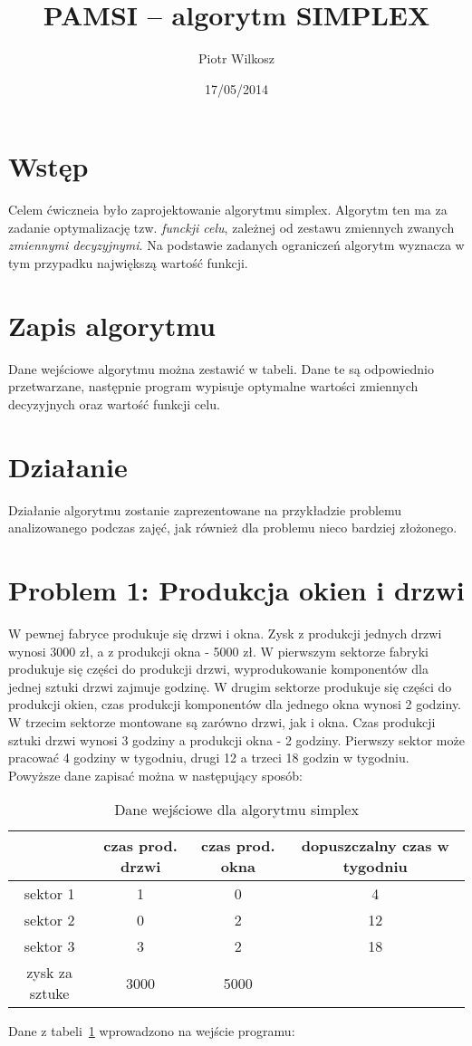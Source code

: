 \documentclass[a4paper,11pt]{article}
\date{17/05/2014}
\title{PAMSI -- algorytm SIMPLEX}
\author{Piotr Wilkosz}
\begin{document}
\maketitle

\section{Wstęp}
Celem ćwiczneia było zaprojektowanie algorytmu simplex. Algorytm ten ma za zadanie optymalizację tzw. \textit{funckji celu}, zależnej od zestawu 
zmiennych zwanych \textit{zmiennymi decyzyjnymi}. Na podstawie zadanych ograniczeń algorytm wyznacza w tym przypadku największą wartość funkcji.

\section{Zapis algorytmu}
Dane wejściowe algorytmu można zestawić w tabeli. Dane te są odpowiednio przetwarzane, następnie program wypisuje optymalne wartości zmiennych decyzyjnych
oraz wartość funkcji celu.

\section{Działanie}
Działanie algorytmu zostanie zaprezentowane na przykładzie problemu analizowanego podczas zajęć, jak również dla problemu nieco bardziej złożonego.
\section{Problem 1: Produkcja okien i drzwi}
W pewnej fabryce produkuje się drzwi i okna. Zysk z produkcji jednych drzwi wynosi 3000 zł, a z produkcji okna - 5000 zł. W pierwszym sektorze
fabryki produkuje się części do produkcji drzwi, wyprodukowanie komponentów dla jednej sztuki drzwi zajmuje godzinę. W drugim sektorze produkuje się części do produkcji okien, czas produkcji
komponentów dla jednego okna wynosi 2 godziny. W trzecim sektorze montowane są zarówno drzwi, jak i okna. Czas produkcji sztuki drzwi wynosi 3 godziny a produkcji okna - 2 godziny.
Pierwszy sektor może pracować 4 godziny w tygodniu, drugi 12 a trzeci 18 godzin w tygodniu.\newpage
Powyższe dane zapisać można w następujący sposób: \\
\begin{table}[h]
\centering
\caption{Dane wejściowe dla algorytmu simplex}
\begin{tabular}{|c|c|c|c|}
 \hline
  & czas prod. drzwi & czas prod. okna & dopuszczalny czas w tygodniu \\
  \hline
  sektor 1 & 1 & 0 & 4 \\
  \hline
  sektor 2 & 0 & 2 & 12\\
  \hline
  sektor 3 & 3 & 2 & 18\\
  \hline 
  zysk za sztuke & 3000 & 5000 & \\
  \hline
  \end{tabular}
\label{tab1}
\end{table}
Dane z tabeli~\ref{tab1} wprowadzono na wejście programu:
\end{document}
